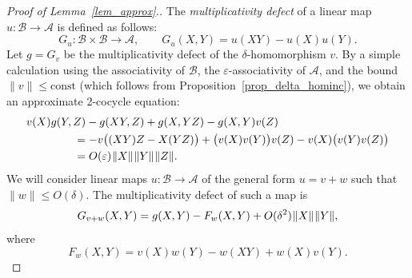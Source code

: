 \documentclass[12pt]{article}
\newcommand{\calA}{\mathcal{A}}
\newcommand{\calB}{\mathcal{B}}
\newcommand{\ts}{\mkern1mu}
\newcommand{\const}{\text{const}}
\newcommand{\eps}{\varepsilon}
\renewcommand{\le}{\leqslant}
\newtheorem[definition]{Definition}[Theorem]{Definition}
\newtheorem[remark]{Example}[Theorem]{Example}
\newtheorem[remark]{Remark}[Theorem]{Remark}
\newtheorem[remark]{Question}[Theorem]{Open question}
\newtheorem*[definition]{definition}{Definition}
\newtheorem*[remark]{example}{Example}
\newtheorem*[remark]{remark}{Remark}
\newtheorem*[remark]{question}{Open question}
\numberwithin{equation}{section}
\begin{document}
\begin{proof}[Proof of Lemma~\ref{lem_approx}.] The \emph{multiplicativity defect} of a linear map $u\colon\calB\to\calA$ is defined as follows:
\begin{equation}
G_u\colon \calB\times\calB\to\calA,\qquad G_u(X,Y)=u(XY)-u(X)u(Y).
\end{equation}
Let $g=G_v$ be the multiplicativity defect of the $\delta$-homomorphism $v$. By a simple calculation using the associativity of $\calB$, the $\eps$-associativity of $\calA$, and the bound $\|v\|\le\const$ (which follows from Proposition~\ref{prop_delta_hominc}), we obtain an approximate 2-cocycle equation:
\begin{equation}
\begin{aligned}
\hspace{1.5cm}&\hspace{-1.5cm} v(X)g(Y,Z)-g(XY,Z)+g(X,YZ)-g(X,Y)v(Z)\\
&= -v\bigl((XY)Z-X(YZ)\bigr)+\bigl(v(X)v(Y)\bigr)v(Z)-v(X)\bigl(v(Y)v(Z)\bigr)\\
&= O(\eps)\ts\|X\|\ts\|Y\|\ts\|Z\|.
\end{aligned}
\end{equation}
We will consider linear maps $u\colon\calB\to\calA$ of the general form $u=v+w$ such that $\|w\|\le O(\delta)$. The multiplicativity defect of such a map is
\begin{equation}
G_{v+w}(X,Y)=g(X,Y)-F_w(X,Y)+O(\delta^2)\ts\|X\|\ts\|Y\|,
\end{equation}
where
\begin{equation}
F_w(X,Y)=v(X)w(Y)-w(XY)+w(X)v(Y).
\end{equation}


\end{proof}
\end{document}
